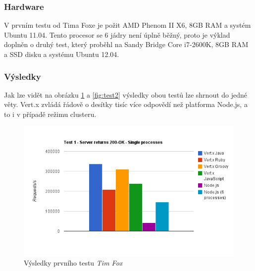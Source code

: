 \subsubsection{Hardware}

V prvním testu od Tima Foxe je požit  AMD Phenom II X6, 8GB RAM a systém Ubuntu 11.04. Tento procesor se 6 jádry není úplně běžný, proto je výklad doplněn o druhý test, který proběhl na Sandy Bridge Core i7-2600K, 8GB RAM a SSD disku a systému Ubuntu 12.04.

\subsubsection{Výsledky}

Jak lze vidět na obrázku \ref{fig:test1} a \ref{fig:test2} výsledky obou testů lze shrnout do jedné věty. Vert.x zvládá řádově o desítky tisíc více odpovědí než platforma Node.js, a to i v případě režimu clusteru.

\begin{figure}[h]
\begin{centering}
\includegraphics[scale=0.7]{obrazky/chart_1}
\par\end{centering}
\caption{Výsledky prvního testu \emph{Tim Fox} \cite{benchmarkTim}\label{fig:test1}}
\end{figure}


